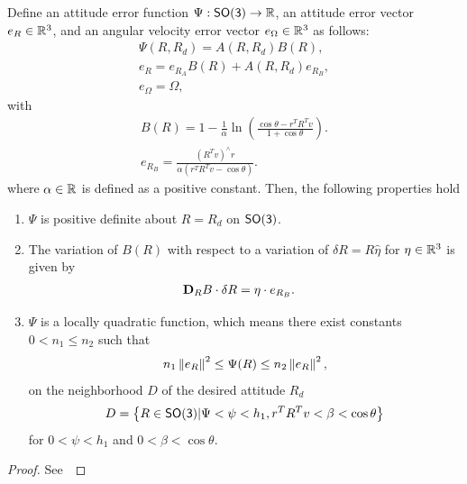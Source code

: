 \begin{prop} \label{prop:repulsive_configuration_error}
Define an attitude error function \( \Psi : \mathsf{SO(3)} \to \mathbb{R} \), an attitude error vector \( e_R \in \mathbb{R}^3 \), and an angular velocity error vector \( e_\Omega \in \mathbb{R}^3 \) as follows:
\begin{gather}
	\Psi(R, R_d) = A(R, R_d) B(R) , \label{eq:psi} \\
	e_R = e_{R_A} B(R) + A(R,R_d) e_{R_B} , \label{eq:eR} \\
	e_\Omega = \Omega , \label{eq:eW}
\end{gather}
with
\begin{gather}
	B(R) = 1 - \frac{1}{\alpha} \ln \left( \frac{\cos \theta -  r^T R^T v}{1 + \cos \theta}\right). \label{eq:B} \\
	e_{R_B} = \frac{\left( R^T v\right)^\wedge r}{\alpha \left(r^T R^T v - \cos \theta \right)}. \label{eq:eRB} 
\end{gather}	
where \( \alpha \in \mathbb{R} \) is defined as a positive constant.
Then, the following properties hold
\begin{enumerate}
	\item \label{item:prop_psi_psd} \(\Psi\) is positive definite about \( R = R_d\) on $\mathsf{SO(3)}$.
	\item \label{item:prop_erb} The variation of \( B(R) \) with respect to a variation of \( \delta R = R \hat{\eta} \) for \( \eta \in \mathbb{R}^3 \) is given by
	\begin{align}\label{eq:dirDiff_B}
		\mathbf{D}_{R} B \cdot \delta R &= \eta \cdot e_{R_{B}}.
	\end{align}
    \item \label{item:prop_psi_quadratic} \( \Psi \) is a locally quadratic function, which means there exist constants \( 0 < n_1 \leq n_2 \) such that
    \begin{align}\label{eq:psi_bound}
        n_1 \left\| e_R \right\|^2 \leq \Psi(R) \leq n_2 \left\| e_R \right\|^2 ,
    \end{align}
    on the neighborhood $D$ of the desired attitude \( R_d \)
    \begin{align}\label{eq:psi_quadratic_domain}
        D = \left\{ R\in\mathsf{SO(3)}  \vert \Psi < \psi < h_1, r^T R^T v < \beta < \cos \theta \right\}
    \end{align}
    for $0<\psi < h_1 $ and $0< \beta<\cos\theta$. 
\end{enumerate}
\end{prop}
\begin{proof}
    See~
\end{proof}

